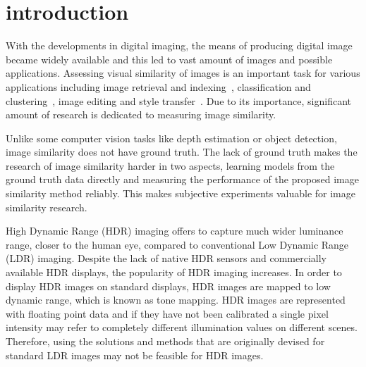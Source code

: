 \chapter{introduction}
\label{chp:b1}
With the developments in digital imaging, the means of producing digital image became widely available and this led to vast amount of images and possible applications. Assessing visual similarity of images is an important task for various applications including image retrieval and indexing~\cite{liu2007survey}, classification and clustering~\cite{kleiman2016toward}, image editing and style transfer~\cite{rawat2018find}. Due to its importance, significant amount of research is dedicated to measuring image similarity. 

Unlike some computer vision tasks like depth estimation or object detection, image similarity does not have ground truth. The lack of ground truth makes the research of image similarity harder in two aspects, learning models from the ground truth data directly and measuring the performance of the proposed image similarity method reliably. This makes subjective experiments valuable for image similarity research.

High Dynamic Range (HDR) imaging offers to capture much wider luminance range, closer to the human eye, compared to conventional Low Dynamic Range (LDR) imaging. Despite the lack of native HDR sensors and commercially available HDR displays, the popularity of HDR imaging increases. In order to display HDR images on standard displays, HDR images are mapped to low dynamic range, which is known as tone mapping. HDR images are represented with floating point data and if they have not been calibrated a single pixel intensity may refer to completely different illumination values on different scenes. Therefore, using the solutions and methods that are originally devised for standard LDR images may not be feasible for HDR images. 

